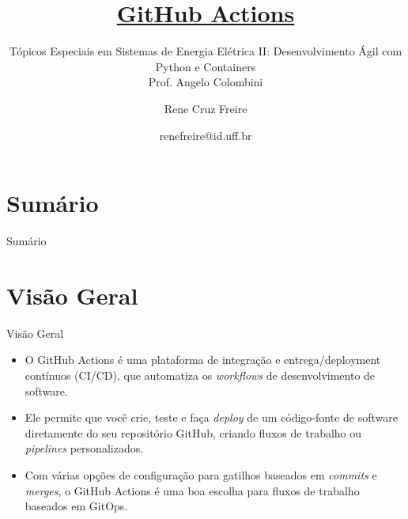 \documentclass[t,serif]{beamer}
\title[GitHub Actions]{\textbf{\underline{GitHub Actions}}}
\subtitle{{\small Tópicos Especiais em Sistemas de Energia Elétrica II: Desenvolvimento Ágil com Python e Containers\\Prof. Angelo Colombini}}
\author[Rene Cruz Freire]{Rene Cruz Freire}
\date{renefreire@id.uff.br}
\institute[]{Universidade Federal Fluminense\\Campus Niterói}
\begin{document}


\section*{Sumário}
	\begin{frame}{Sumário}
		\scriptsize
		\tableofcontents%
	\end{frame}

\section{Visão Geral}
	\begin{frame}{Visão Geral}
		\vspace{0.5cm}
		\begin{itemize}
			\item O GitHub Actions é uma plataforma de integração e entrega/deployment contínuos (CI/CD), que automatiza os \textit{workflows} de desenvolvimento de software.
			\vspace{0.5cm}
			\item Ele permite que você crie, teste e faça \textit{deploy} de um código-fonte de software diretamente do seu repositório GitHub, criando fluxos de trabalho ou \textit{pipelines} personalizados.
			\vspace{0.5cm}
			\item Com várias opções de configuração para gatilhos baseados em \textit{commits} e \textit{merges}, o GitHub Actions é uma boa escolha para fluxos de trabalho baseados em GitOps.
		\end{itemize}
	\end{frame}
	
\end{document}
